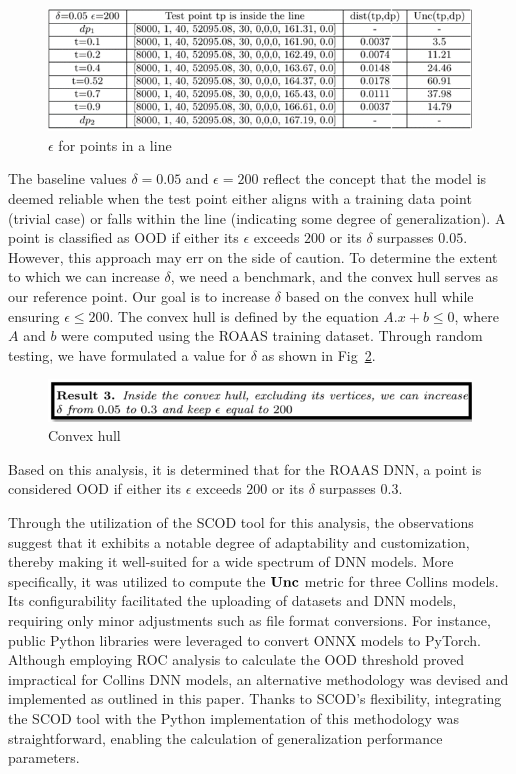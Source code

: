 \begin{figure}[ht]
\centering
\includegraphics[scale=0.65]{Fig/OOD_result1Exa.png}
\caption{$\epsilon$ for points in a line}
\label{fig:line}
\end{figure}
The baseline values $\delta=0.05$ and $\epsilon=200$ reflect the concept that the model is deemed reliable when the test point either aligns with a training data point (trivial case) or falls within the line (indicating some degree of generalization). A point is classified as OOD if either its $\epsilon$ exceeds $200$ or its $\delta$ surpasses $0.05$. However, this approach may err on the side of caution. To determine the extent to which we can increase $\delta$, we need a benchmark, and the convex hull serves as our reference point. Our goal is to increase $\delta$ based on the convex hull while ensuring $\epsilon \leq 200$. The convex hull is defined by the equation $A.x+b\leq 0$, where $A$ and $b$ were computed using the ROAAS training dataset. Through random testing, we have formulated a value for $\delta$ as shown in Fig~\ref{fig:ConHull}. 
\begin{figure}[ht]
\centering
\includegraphics[scale=0.65]{Fig/OOD_result3.png}
\caption{Convex hull}
\label{fig:ConHull}
\end{figure}
Based on this analysis, it is determined that for the ROAAS DNN, a point is considered OOD if either its $\epsilon$ exceeds $200$ or its $\delta$ surpasses $0.3$.



Through the utilization of the SCOD tool for this analysis, the observations suggest that it exhibits a notable degree of adaptability and customization, thereby making it well-suited for a wide spectrum of DNN models. More specifically, it was utilized to compute the $\bf{Unc}$ metric for three Collins models. Its configurability facilitated the uploading of datasets and DNN models, requiring only minor adjustments such as file format conversions. For instance, public Python libraries were leveraged to convert ONNX models to PyTorch. Although employing ROC analysis to calculate the OOD threshold proved impractical for Collins DNN models, an alternative methodology was devised and implemented as outlined in this paper. Thanks to SCOD's flexibility, integrating the SCOD tool with the Python implementation of this methodology was straightforward, enabling the calculation of generalization performance parameters.